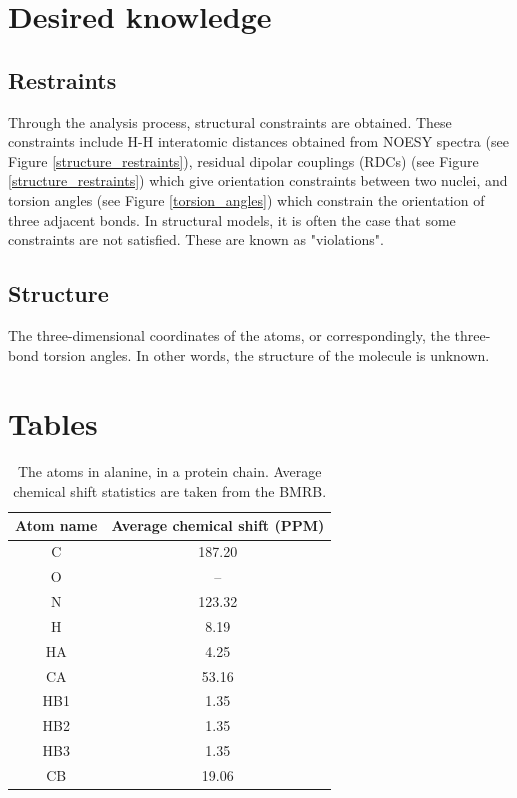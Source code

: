 \section{Desired knowledge}

\subsection{Restraints}
Through the analysis process, structural constraints are obtained.  These 
constraints include H-H interatomic distances obtained from NOESY spectra
(see Figure \ref{structure_restraints}), residual dipolar couplings (RDCs) 
(see Figure \ref{structure_restraints}) which give orientation constraints
between two nuclei, and torsion angles 
(see Figure \ref{torsion_angles}) which constrain the orientation of three
adjacent bonds.
In structural models, it is often the case that some constraints are not 
satisfied.  These are known as "violations".

\subsection{Structure} 
The three-dimensional coordinates of the atoms, or correspondingly, the
three-bond torsion angles.  In other words, the structure of the molecule
is unknown.



\clearpage
\section{Tables}

\begin{table}[h]
  \begin{tabular}{ | c | c | }
    \hline
    Atom name   &  Average chemical shift (PPM)  \\  \hline
    C           &  187.20     \\  \hline
    O           &  --         \\  \hline
    N           &  123.32     \\  \hline
    H           &  8.19       \\  \hline
    HA          &  4.25       \\  \hline
    CA          &  53.16      \\  \hline
    HB1         &  1.35       \\  \hline
    HB2         &  1.35       \\  \hline    
    HB3         &  1.35       \\  \hline
    CB          &  19.06      \\  \hline
  \end{tabular}
  \caption[The atoms in alanine, in a protein chain.]
          {The atoms in alanine, in a protein chain.
           Average chemical shift statistics are taken from the BMRB.}
  \label{alanine_atoms}
\end{table}

